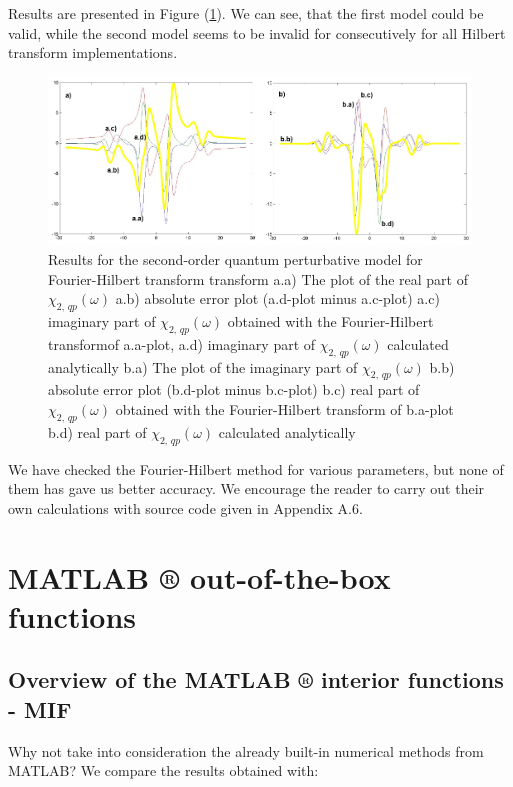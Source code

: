 \documentclass[12pt,twoside,a4paper]{article}
\numberwithin{equation}{subsection}
\numberwithin{figure}{subsection}
\begin{document}
Results are presented in Figure (\ref{fig:four_qp2}). We can see, that the first model could be valid, while the second model seems to be invalid for consecutively for all Hilbert transform implementations.

\begin{figure} 
  \includegraphics[width=150mm]{img/four_qp2.png}
  \caption{Results for the second-order quantum perturbative model for Fourier-Hilbert transform transform
     a.a) The plot of the real part of ${\chi_{2, \,qp}}(\omega )$
     a.b) absolute error plot (a.d-plot minus a.c-plot)
     a.c) imaginary part of $\chi_{2, \, qp} (\omega )$ obtained with the Fourier-Hilbert transformof a.a-plot, 
     a.d) imaginary part of $\chi_{2, \, qp} (\omega )$ calculated analytically 
     b.a) The plot of the imaginary part of ${\chi_{2, \, qp}}(\omega )$ 
     b.b) absolute error plot (b.d-plot minus b.c-plot)
     b.c) real part of $\chi_{2, \, qp} (\omega )$ obtained with the Fourier-Hilbert transform of b.a-plot 
     b.d) real part of $\chi_{2, \, qp} (\omega )$ calculated analytically 
     \label{fig:four_qp2}
     }
\end{figure} 

We have checked the Fourier-Hilbert method for various parameters, but none of them has gave us better accuracy. We encourage the reader to carry out their own calculations with source code given in Appendix A.6.

\section{MATLAB ® out-of-the-box functions} \label{chap:matlab}

\subsection{Overview of the MATLAB ® interior functions - MIF} \label{chap:matlab_overview}

Why not take into consideration the already built-in numerical methods from MATLAB? We compare the results obtained with: 
\end{document}
